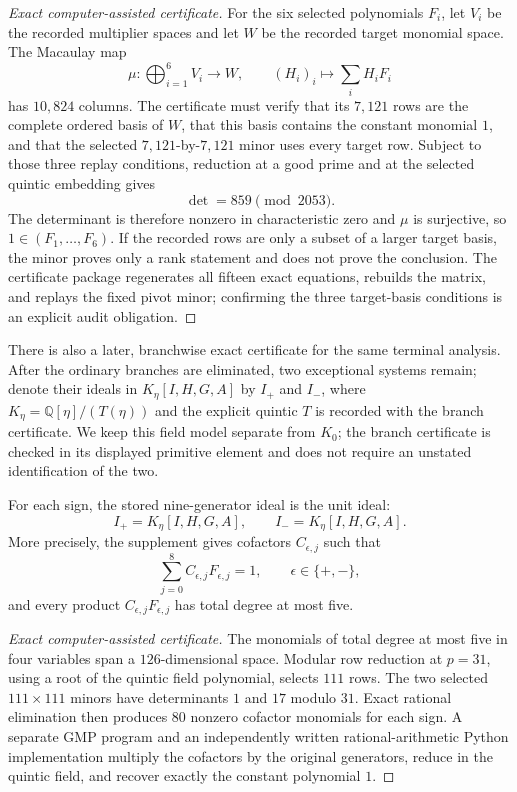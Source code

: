 \begin{proof}[Exact computer-assisted certificate]
For the six selected polynomials \(F_i\), let \(V_i\) be the recorded
multiplier spaces and let \(W\) be the recorded target monomial space.  The
Macaulay map
\[
\mu:\bigoplus_{i=1}^6V_i\longrightarrow W,
\qquad (H_i)_i\longmapsto\sum_i H_iF_i
\]
has \(10{,}824\) columns.  The certificate must verify that its
\(7{,}121\) rows are the complete ordered basis of \(W\), that this basis
contains the constant monomial \(1\), and that the selected
\(7{,}121\)-by-\(7{,}121\) minor uses every target row.  Subject to those
three replay conditions, reduction at a good prime and at the selected
quintic embedding gives
\[
\det=859\pmod{2053}.
\]
The determinant is therefore nonzero in characteristic zero and \(\mu\) is
surjective, so \(1\in(F_1,\ldots,F_6)\).  If the recorded rows are only a
subset of a larger target basis, the minor proves only a rank statement and
does not prove the conclusion.  The certificate package regenerates all
fifteen exact equations, rebuilds the matrix, and replays the fixed pivot
minor; confirming the three target-basis conditions is an explicit audit
obligation.
\end{proof}

There is also a later, branchwise exact certificate for the same terminal
analysis.  After the ordinary branches are eliminated, two exceptional
systems remain; denote their ideals in
\(K_\eta[I,H,G,A]\) by \(I_+\) and \(I_-\), where
\(K_\eta=\mathbb Q[\eta]/(T(\eta))\) and the explicit quintic
\(T\) is recorded with the branch certificate.  We keep this field model
separate from \(K_0\); the branch certificate is checked in its displayed
primitive element and does not require an unstated identification of the two.

\begin{theorem}
\label{thm:branchwise-terminal-unit}
For each sign, the stored nine-generator ideal is the unit ideal:
\[
I_+=K_\eta[I,H,G,A],\qquad I_-=K_\eta[I,H,G,A].
\]
More precisely, the supplement gives cofactors \(C_{\epsilon,j}\) such that
\[
\sum_{j=0}^{8}C_{\epsilon,j}F_{\epsilon,j}=1,
\qquad \epsilon\in\{+,-\},
\]
and every product \(C_{\epsilon,j}F_{\epsilon,j}\) has total degree at most
five.
\end{theorem}

\begin{proof}[Exact computer-assisted certificate]
The monomials of total degree at most five in four variables span a
\(126\)-dimensional space.  Modular row reduction at \(p=31\), using a root
of the quintic field polynomial, selects \(111\) rows.  The two selected
\(111\times111\) minors have determinants \(1\) and \(17\) modulo \(31\).
Exact rational elimination then produces 80 nonzero cofactor monomials for
each sign.  A separate GMP program and an independently written
rational-arithmetic Python implementation multiply the cofactors by the
original generators, reduce in the quintic field, and recover exactly the
constant polynomial \(1\).
\end{proof}

